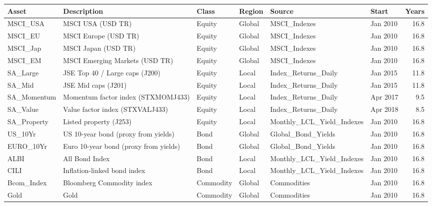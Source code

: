 \documentclass[11pt,preprint]{elsarticle}
\let\origtable\table
\let\endorigtable\endtable
\renewenvironment{table}[1][2] {
    \expandafter\origtable\expandafter[H]
} {
    \endorigtable
}
\numberwithin{equation}{section}
\numberwithin{figure}{section}
\numberwithin{table}{section}
\begin{document}
\begin{table}[!htbp]
\centering
\caption{Candidate assets (all series end in September 2026)} 
\label{tab:assets}
\begingroup\scriptsize
\begin{tabular}{llllllr}
  \hline
Asset & Description & Class & Region & Source & Start & Years \\ 
  \hline
MSCI\_USA & MSCI USA (USD TR) & Equity & Global & MSCI\_Indexes & Jan 2010 & 16.8 \\ 
  MSCI\_EU & MSCI Europe (USD TR) & Equity & Global & MSCI\_Indexes & Jan 2010 & 16.8 \\ 
  MSCI\_Jap & MSCI Japan (USD TR) & Equity & Global & MSCI\_Indexes & Jan 2010 & 16.8 \\ 
  MSCI\_EM & MSCI Emerging Markets (USD TR) & Equity & Global & MSCI\_Indexes & Jan 2010 & 16.8 \\ 
  SA\_Large & JSE Top 40 / Large caps (J200) & Equity & Local & Index\_Returns\_Daily & Jan 2015 & 11.8 \\ 
  SA\_Mid & JSE Mid caps (J201) & Equity & Local & Index\_Returns\_Daily & Jan 2015 & 11.8 \\ 
  SA\_Momentum & Momentum factor index (STXMOMJ433) & Equity & Local & Index\_Returns\_Daily & Apr 2017 & 9.5 \\ 
  SA\_Value & Value factor index (STXVALJ433) & Equity & Local & Index\_Returns\_Daily & Apr 2018 & 8.5 \\ 
  SA\_Property & Listed property (J253) & Equity & Local & Monthly\_LCL\_Yield\_Indexes & Jan 2010 & 16.8 \\ 
  US\_10Yr & US 10-year bond (proxy from yields) & Bond & Global & Global\_Bond\_Yields & Jan 2010 & 16.8 \\ 
  EURO\_10Yr & Euro 10-year bond (proxy from yields) & Bond & Global & Global\_Bond\_Yields & Jan 2010 & 16.8 \\ 
  ALBI & All Bond Index & Bond & Local & Monthly\_LCL\_Yield\_Indexes & Jan 2010 & 16.8 \\ 
  CILI & Inflation-linked bond index & Bond & Local & Monthly\_LCL\_Yield\_Indexes & Jan 2010 & 16.8 \\ 
  Bcom\_Index & Bloomberg Commodity index & Commodity & Global & Commodities & Jan 2010 & 16.8 \\ 
  Gold & Gold & Commodity & Global & Commodities & Jan 2010 & 16.8 \\ 
   \hline
\end{tabular}
\endgroup
\end{table}
\end{document}
